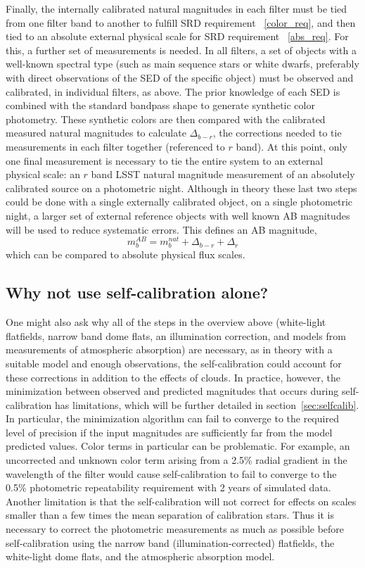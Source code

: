 \documentclass[12pt,preprint]{aastex}
\begin{document}
Finally, the internally calibrated natural magnitudes in each filter
must be tied from one filter band to another to fulfill SRD
requirement ~\ref{color_req}, and then tied to an absolute external
physical scale for SRD requirement ~\ref{abs_req}.  For this, a
further set of measurements is needed. In all filters, a set of
objects with a well-known spectral type (such as main sequence stars
or white dwarfs, preferably with direct observations of the SED of the
specific object) must be observed and calibrated, in individual
filters, as above. The prior knowledge of each SED is combined with
the standard bandpass shape to generate synthetic color
photometry. These synthetic colors are then compared with the
calibrated measured natural magnitudes to calculate $\Delta_{b-r}$,
the corrections needed to tie measurements in each filter together
(referenced to $r$ band).  At this point, only one final measurement
is necessary to tie the entire system to an external physical scale:
an $r$ band LSST natural magnitude measurement of an absolutely
calibrated source on a photometric night. Although in theory these
last two steps could be done with a single externally calibrated
object, on a single photometric night, a larger set of external
reference objects with well known AB magnitudes will be used to reduce
systematic errors. This defines an AB magnitude,
\begin{equation}
\label{eqn:extmags}
m_b^{AB} = m_b^{nat}  + \Delta_{b-r} + \Delta_r
\end{equation}
which can be compared to absolute physical flux scales. 

\subsection{Why not use self-calibration alone?}

One might also ask why all of the steps in the overview above
(white-light flatfields, narrow band dome flats, an illumination
correction, and models from measurements of atmospheric absorption)
are necessary, as in theory with a suitable model and enough observations, the self-calibration could account for
these corrections in addition to the effects of clouds. In practice,
however, the minimization between observed and predicted magnitudes
that occurs during self-calibration has limitations, which will be
further detailed in section~\ref{sec:selfcalib}.  In particular, the
minimization algorithm can fail to converge to the required level of
precision if the input magnitudes are sufficiently far from the model
predicted values.  Color terms in particular can be problematic. For
example, an uncorrected and unknown color term arising from a 2.5\%
radial gradient in the wavelength of the filter would cause
self-calibration to fail to converge to the 0.5\% photometric
repeatability requirement with 2 years of simulated data. Another
limitation is that the self-calibration will not correct for
effects on scales smaller than a few times the mean separation of
calibration stars. Thus it is necessary to correct the photometric
measurements as much as possible before self-calibration using the
narrow band (illumination-corrected) flatfields, the white-light dome
flats, and the atmospheric absorption model.
\end{document}
